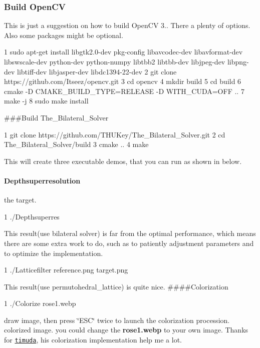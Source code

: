 \subsubsection*{Build Open\+CV}

This is just a suggestion on how to build Open\+CV 3.. There a plenty of options. Also some packages might be optional. 
\begin{DoxyCode}
1 sudo apt-get install libgtk2.0-dev pkg-config libavcodec-dev libavformat-dev libswscale-dev python-dev
       python-numpy libtbb2 libtbb-dev libjpeg-dev libpng-dev libtiff-dev libjasper-dev libdc1394-22-dev
2 git clone https://github.com/Itseez/opencv.git
3 cd opencv
4 mkdir build
5 cd build
6 cmake -D CMAKE\_BUILD\_TYPE=RELEASE -D WITH\_CUDA=OFF ..
7 make -j
8 sudo make install
\end{DoxyCode}


\#\#\#\+Build The\+\_\+\+Bilateral\+\_\+\+Solver 
\begin{DoxyCode}
1 git clone https://github.com/THUKey/The\_Bilateral\_Solver.git
2 cd The\_Bilateral\_Solver/build
3 cmake ..
4 make
\end{DoxyCode}
 This will create three executable demos, that you can run as shown in below.

\paragraph*{Depthsuperresolution}

 the target. 
\begin{DoxyCode}
1 ./Depthsuperres
\end{DoxyCode}
  This result(use bilateral solver) is far from the optimal performance, which means there are some extra work to do, such as to patiently adjustment parameters and to optimize the implementation. 
\begin{DoxyCode}
1 ./Latticefilter reference.png target.png
\end{DoxyCode}
  This result(use permutohedral\+\_\+lattice) is quite nice. \#\#\#\#\+Colorization 
\begin{DoxyCode}
1 ./Colorize rose1.webp
\end{DoxyCode}
  draw image, then press \char`\"{}\+E\+S\+C\char`\"{} twice to launch the colorization procession.  colorized image. you could change the {\bfseries rose1.\+webp} to your own image. Thanks for \href{https://github.com/timuda/colorization_s_demo}{\tt timuda}, his colorization implementation help me a lot.

